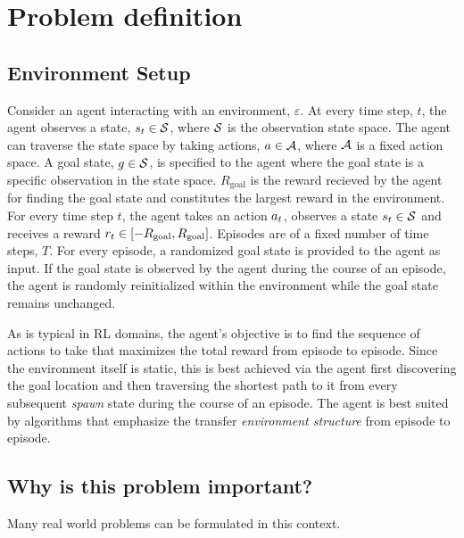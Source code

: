 \section{Problem definition}

\subsection{Environment Setup}
\newcommand{\Rgoal}{R_{\text{goal}}}
Consider an agent interacting with an environment, $\varepsilon$. At
every time step, $t$, the agent observes a state, $s_t \in \mathcal{S}$,
where $\mathcal{S}$ is the observation state space. The agent can traverse
the state space by taking actions, $a \in \mathcal{A}$, where $\mathcal{A}$ is a
fixed action space. A goal state, $g \in \mathcal{S}$, is specified to
the agent where the goal state is a specific observation in the state
space.  $\Rgoal$ is the reward recieved by the agent for finding the
goal state and constitutes the largest reward in the environment.  For
every time step $t$, the agent takes an action $a_t$, observes a
state $s_t \in \mathcal{S}$ and receives a reward $\rew_t \in [-\Rgoal,
\Rgoal]$.  Episodes are of a fixed number of time steps, $T$. For every
episode, a randomized goal state is provided to the agent as input. If
the goal state is observed by the agent during the course of an episode,
the agent is randomly reinitialized within the environment while the
goal state remains unchanged.

As is typical in RL domains, the agent's objective is to find the
sequence of actions to take that maximizes the total reward from episode
to episode. Since the environment itself is static, this is best
achieved via the agent first discovering the goal location and then
traversing the shortest path to it from every subsequent \emph{spawn}
state during the course of an episode. The agent is best suited by
algorithms that emphasize the  transfer \emph{environment structure}
from episode to episode. 



%
%

\subsection{Why is this problem important?}
Many real world problems can be formulated in this context.

